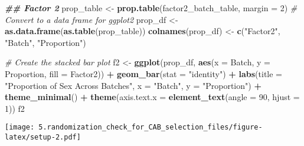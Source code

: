 \documentclass[
]{article}
\newenvironment{Shaded}{\begin{snugshade}}{\end{snugshade}}
\newcommand{\AttributeTok}[1]{\textcolor[rgb]{0.13,0.29,0.53}{#1}}
\newcommand{\CommentTok}[1]{\textcolor[rgb]{0.56,0.35,0.01}{\textit{#1}}}
\newcommand{\DecValTok}[1]{\textcolor[rgb]{0.00,0.00,0.81}{#1}}
\newcommand{\DocumentationTok}[1]{\textcolor[rgb]{0.56,0.35,0.01}{\textbf{\textit{#1}}}}
\newcommand{\FunctionTok}[1]{\textcolor[rgb]{0.13,0.29,0.53}{\textbf{#1}}}
\newcommand{\NormalTok}[1]{#1}
\newcommand{\OtherTok}[1]{\textcolor[rgb]{0.56,0.35,0.01}{#1}}
\newcommand{\SpecialCharTok}[1]{\textcolor[rgb]{0.81,0.36,0.00}{\textbf{#1}}}
\newcommand{\StringTok}[1]{\textcolor[rgb]{0.31,0.60,0.02}{#1}}
\begin{document}
\begin{Shaded}
\begin{Highlighting}[]
\DocumentationTok{\#\# Factor 2}
\NormalTok{prop\_table }\OtherTok{\textless{}{-}} \FunctionTok{prop.table}\NormalTok{(factor2\_batch\_table, }\AttributeTok{margin =} \DecValTok{2}\NormalTok{)}
\CommentTok{\# Convert to a data frame for ggplot2}
\NormalTok{prop\_df }\OtherTok{\textless{}{-}} \FunctionTok{as.data.frame}\NormalTok{(}\FunctionTok{as.table}\NormalTok{(prop\_table))}
\FunctionTok{colnames}\NormalTok{(prop\_df) }\OtherTok{\textless{}{-}} \FunctionTok{c}\NormalTok{(}\StringTok{"Factor2"}\NormalTok{, }\StringTok{"Batch"}\NormalTok{, }\StringTok{"Proportion"}\NormalTok{)}

\CommentTok{\# Create the stacked bar plot}
\NormalTok{f2 }\OtherTok{\textless{}{-}} \FunctionTok{ggplot}\NormalTok{(prop\_df, }\FunctionTok{aes}\NormalTok{(}\AttributeTok{x =}\NormalTok{ Batch, }\AttributeTok{y =}\NormalTok{ Proportion, }\AttributeTok{fill =}\NormalTok{ Factor2)) }\SpecialCharTok{+}
  \FunctionTok{geom\_bar}\NormalTok{(}\AttributeTok{stat =} \StringTok{"identity"}\NormalTok{) }\SpecialCharTok{+}
  \FunctionTok{labs}\NormalTok{(}\AttributeTok{title =} \StringTok{"Proportion of Sex Across Batches"}\NormalTok{, }\AttributeTok{x =} \StringTok{"Batch"}\NormalTok{, }\AttributeTok{y =} \StringTok{"Proportion"}\NormalTok{) }\SpecialCharTok{+}
  \FunctionTok{theme\_minimal}\NormalTok{() }\SpecialCharTok{+}
  \FunctionTok{theme}\NormalTok{(}\AttributeTok{axis.text.x =} \FunctionTok{element\_text}\NormalTok{(}\AttributeTok{angle =} \DecValTok{90}\NormalTok{, }\AttributeTok{hjust =} \DecValTok{1}\NormalTok{))}
\NormalTok{f2}
\end{Highlighting}
\end{Shaded}

\texttt{[image: 5.randomization\_check\_for\_CAB\_selection\_files/figure-latex/setup-2.pdf]}

\begin{Shaded}
\end{Shaded}
\end{document}
